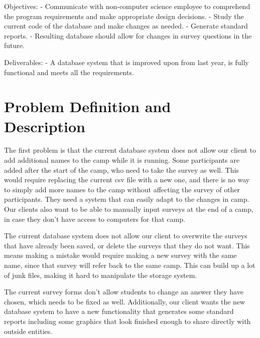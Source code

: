 \documentclass[onecolumn, draftclsnofoot,10pt, compsoc]{IEEEtran}
\begin{document}
Objectives: \newline
- Communicate with non-computer science employee to comprehend the program requirements and make appropriate design decisions.\newline
- Study the current code of the database and make changes as needed. \newline
- Generate standard reports. \newline
- Resulting database should allow for changes in survey questions in the future.\newline\newline

Deliverables: \newline
- A database system that is improved upon from last year, is fully functional and meets all the requirements.\newline\newline


\section{Problem Definition and Description}
The first problem is that the current database system does not allow our client to add additional names to the camp while it is running. Some participants are added after the start of the camp, who need to take the survey as well. This would require replacing the current csv file with a new one, and there is no way to simply add more names to the camp without affecting the survey of other participants. They need a system that can easily adapt to the changes in camp. Our clients also want to be able to manually input surveys at the end of a camp, in case they don\rq t have access to computers for that camp.
\newline

The current database system does not allow our client to overwrite the surveys that have already been saved, or delete the surveys that they do not want. This means making a mistake would require making a new survey with the same name, since that survey will refer back to the same camp. This can build up a lot of junk files, making it hard to manipulate the storage system. 
\newline

The current survey forms don\rq t allow students to change an answer they have chosen, which needs to be fixed as well. Additionally, our client wants the new database system to have a new functionality that generates some standard reports including some graphics that look finished enough to share directly with outside entities.
\newline\newline
\end{document}
